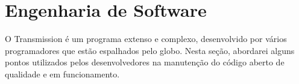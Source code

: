 
\section{Engenharia de Software}

O Transmission é um programa extenso e complexo, desenvolvido por vários programadores
que estão espalhados pelo globo. Nesta seção, abordarei alguns pontos utilizados pelos
desenvolvedores na manutenção do código aberto de qualidade e em funcionamento.